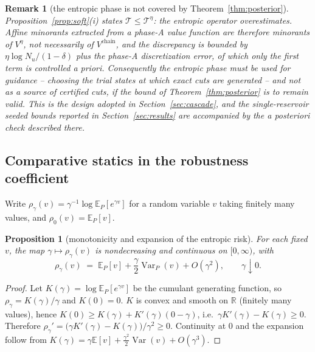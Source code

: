 \documentclass[pdflatex,sn-mathphys-num]{sn-jnl}
\theoremstyle{thmstyleone}
\newtheorem{proposition}[theorem]{Proposition}
\theoremstyle{thmstyletwo}
\newtheorem{remark}[theorem]{Remark}
\theoremstyle{thmstylethree}
\newcommand{\E}{\mathbb{E}}
\newcommand{\R}{\mathbb{R}}
\begin{document}
\begin{appendices}
\begin{remark}[the entropic phase is not covered by
Theorem~\ref{thm:posterior}]
\label{rem:seedvalidity}
Proposition~\ref{prop:soft}(i) states $\mathcal T\le\mathcal T^\eta$: the
entropic operator \emph{over}estimates. Affine minorants extracted from a
phase-A value function are therefore minorants of $V^\eta$, not
necessarily of $V^{\mathrm{chain}}$, and the discrepancy is bounded by
$\eta\log N_u/(1-\delta)$ plus the phase-A discretization error, of which
only the first term is controlled a priori. Consequently the entropic
phase must be used for \emph{guidance} -- choosing the trial states at
which exact cuts are generated -- and not as a source of certified cuts,
if the bound of Theorem~\ref{thm:posterior} is to remain valid. This is the
design adopted in Section~\ref{sec:cascade}, and the single-reservoir
seeded bounds reported in Section~\ref{sec:results} are accompanied by the
a posteriori check described there.
\end{remark}

\subsection{Comparative statics in the robustness coefficient}
\label{app:gamma}

Write $\rho_\gamma(v)=\gamma^{-1}\log\E_P[e^{\gamma v}]$ for a random
variable $v$ taking finitely many values, and $\rho_0(v)=\E_P[v]$.

\begin{proposition}[monotonicity and expansion of the entropic risk]
\label{prop:rhomono}
For each fixed $v$, the map $\gamma\mapsto\rho_\gamma(v)$ is nondecreasing
and continuous on $[0,\infty)$, with
\[
\rho_\gamma(v)\;=\;\E_P[v]+\frac{\gamma}{2}\operatorname{Var}_P(v)+O(\gamma^2),
\qquad \gamma\downarrow0 .
\]
\end{proposition}

\begin{proof}
Let $K(\gamma)=\log\E_P[e^{\gamma v}]$ be the cumulant generating function,
so $\rho_\gamma=K(\gamma)/\gamma$ and $K(0)=0$. $K$ is convex and smooth on
$\R$ (finitely many values), hence $K(0)\ge K(\gamma)+K'(\gamma)(0-\gamma)$,
i.e.\ $\gamma K'(\gamma)-K(\gamma)\ge0$. Therefore
$\rho_\gamma' = \big(\gamma K'(\gamma)-K(\gamma)\big)/\gamma^2 \ge 0$.
Continuity at $0$ and the expansion follow from
$K(\gamma)=\gamma\E[v]+\tfrac{\gamma^2}{2}\operatorname{Var}(v)+O(\gamma^3)$.
\end{proof}


\end{appendices}
\end{document}

